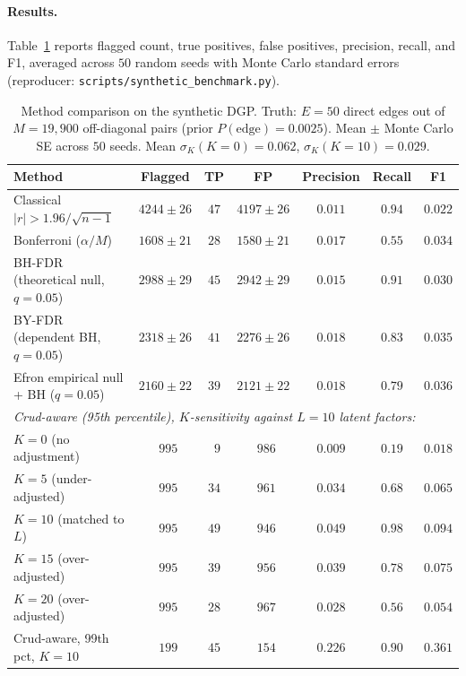 \paragraph{Results.} Table~\ref{tab:synthetic-benchmark} reports flagged count, true positives, false positives, precision, recall, and F1, averaged across $50$ random seeds with Monte Carlo standard errors (reproducer: \texttt{scripts/synthetic\_benchmark.py}).

\begin{table}[h]
\centering
\small
\caption{Method comparison on the synthetic DGP. Truth: $E=50$ direct edges out of $M=19{,}900$ off-diagonal pairs (prior $P(\mathrm{edge})=0.0025$). Mean $\pm$ Monte Carlo SE across $50$ seeds. Mean $\sigma_K(K=0)=0.062$, $\sigma_K(K=10)=0.029$.}
\label{tab:synthetic-benchmark}
\begin{tabular}{lcccccc}
\toprule
Method & Flagged & TP & FP & Precision & Recall & F1 \\
\midrule
Classical $|r|>1.96/\sqrt{n-1}$       & $4244\pm 26$ & $47$ & $4197\pm 26$ & $0.011$ & $0.94$ & $0.022$ \\
Bonferroni ($\alpha/M$)               & $1608\pm 21$ & $28$ & $1580\pm 21$ & $0.017$ & $0.55$ & $0.034$ \\
BH-FDR (theoretical null, $q=0.05$)   & $2988\pm 29$ & $45$ & $2942\pm 29$ & $0.015$ & $0.91$ & $0.030$ \\
BY-FDR (dependent BH, $q=0.05$)       & $2318\pm 26$ & $41$ & $2276\pm 26$ & $0.018$ & $0.83$ & $0.035$ \\
Efron empirical null + BH ($q=0.05$)  & $2160\pm 22$ & $39$ & $2121\pm 22$ & $0.018$ & $0.79$ & $0.036$ \\
\midrule
\multicolumn{7}{l}{\emph{Crud-aware (95th percentile), $K$-sensitivity against $L=10$ latent factors:}} \\
\phantom{XX}$K=0$ (no adjustment)     & $\phantom{0}995$ & $\phantom{0}9$ & $\phantom{0}986$ & $0.009$ & $0.19$ & $0.018$ \\
\phantom{XX}$K=5$ (under-adjusted)    & $\phantom{0}995$ & $34$ & $\phantom{0}961$ & $0.034$ & $0.68$ & $0.065$ \\
\phantom{XX}$K=10$ (matched to $L$)   & $\phantom{0}995$ & $49$ & $\phantom{0}946$ & $0.049$ & $0.98$ & $0.094$ \\
\phantom{XX}$K=15$ (over-adjusted)    & $\phantom{0}995$ & $39$ & $\phantom{0}956$ & $0.039$ & $0.78$ & $0.075$ \\
\phantom{XX}$K=20$ (over-adjusted)    & $\phantom{0}995$ & $28$ & $\phantom{0}967$ & $0.028$ & $0.56$ & $0.054$ \\
\midrule
Crud-aware, 99th pct, $K=10$          & $\phantom{0}199$ & $45$ & $\phantom{0}154$ & $0.226$ & $0.90$ & $0.361$ \\
\bottomrule
\end{tabular}
\end{table}

